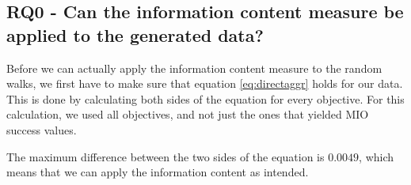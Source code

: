 \subsection[RQ0]{RQ0 - Can the information content measure be applied to the generated data?}\label{sec:rq0}

Before we can actually apply the information content measure to the random walks, we first have to make sure that equation \ref{eq:directaggr} holds for our data.
This is done by calculating both sides of the equation for every objective.
For this calculation, we used all objectives, and not just the ones that yielded MIO success values.

The maximum difference between the two sides of the equation is $0.0049$, which means that we can apply the information content as intended.